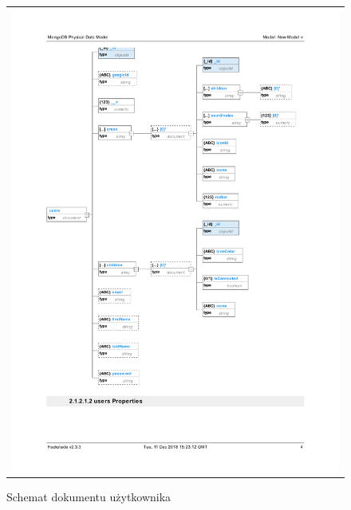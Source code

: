 \documentclass{sprawozdanie-agh}
\begin{document}
			\begin{figure}[H] 
				\centering
				\begin{tabular}{c}
					\includegraphics[width=.95\textwidth]{usersDatabase}
				\end{tabular} 
				\caption{Schemat dokumentu użytkownika}
			\end{figure}
\end{document}
